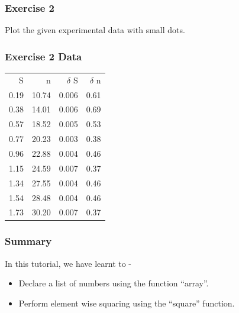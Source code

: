 \documentclass[17pt]{beamer}
\begin{document}
\begin{frame}
\frametitle{Exercise 2}
\label{sec-6}

  Plot the given experimental data with small dots.     
\end{frame}
\begin{frame}
\frametitle{Exercise 2 Data}
\label{sec-7}

\begin{center}
\begin{small}
\begin{tabular}{rrrr}

    S  &      n  &  $\delta$ S  &  $\delta$ n  \\
 0.19  &  10.74  &       0.006  &        0.61  \\
 0.38  &  14.01  &       0.006  &        0.69  \\
 0.57  &  18.52  &       0.005  &        0.53  \\
 0.77  &  20.23  &       0.003  &        0.38  \\
 0.96  &  22.88  &       0.004  &        0.46  \\
 1.15  &  24.59  &       0.007  &        0.37  \\
 1.34  &  27.55  &       0.004  &        0.46  \\
 1.54  &  28.48  &       0.004  &        0.46  \\
 1.73  &  30.20  &       0.007  &        0.37  \\

\end{tabular}
\end{small}
\end{center}
\end{frame}
\begin{frame}
\frametitle{Summary}
\label{sec-8}

  In this tutorial, we have learnt to -\pause

\begin{itemize}
\item Declare a list of numbers using the function ``array''.\pause
\item Perform element wise squaring using the ``square'' function.
\end{itemize}
\end{frame}
\end{document}
